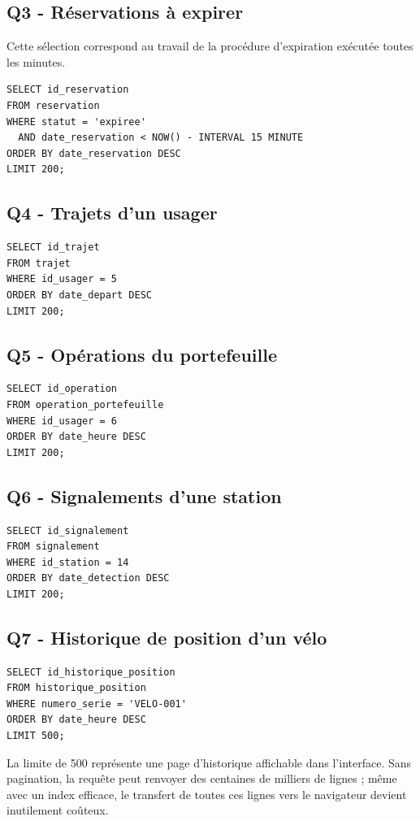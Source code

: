 \documentclass[11pt,a4paper]{article}
\begin{document}
\subsection{Q3 - Réservations à expirer}
Cette sélection correspond au travail de la procédure d'expiration exécutée toutes les minutes.
\begin{verbatim}
SELECT id_reservation
FROM reservation
WHERE statut = 'expiree'
  AND date_reservation < NOW() - INTERVAL 15 MINUTE
ORDER BY date_reservation DESC
LIMIT 200;
\end{verbatim}

\subsection{Q4 - Trajets d'un usager}
\begin{verbatim}
SELECT id_trajet
FROM trajet
WHERE id_usager = 5
ORDER BY date_depart DESC
LIMIT 200;
\end{verbatim}

\subsection{Q5 - Opérations du portefeuille}
\begin{verbatim}
SELECT id_operation
FROM operation_portefeuille
WHERE id_usager = 6
ORDER BY date_heure DESC
LIMIT 200;
\end{verbatim}

\subsection{Q6 - Signalements d'une station}
\begin{verbatim}
SELECT id_signalement
FROM signalement
WHERE id_station = 14
ORDER BY date_detection DESC
LIMIT 200;
\end{verbatim}

\subsection{Q7 - Historique de position d'un vélo}
\begin{verbatim}
SELECT id_historique_position
FROM historique_position
WHERE numero_serie = 'VELO-001'
ORDER BY date_heure DESC
LIMIT 500;
\end{verbatim}
La limite de 500 représente une page d'historique affichable dans l'interface. Sans pagination, la requête peut renvoyer des centaines de milliers de lignes ; même avec un index efficace, le transfert de toutes ces lignes vers le navigateur devient inutilement coûteux.
\end{document}
